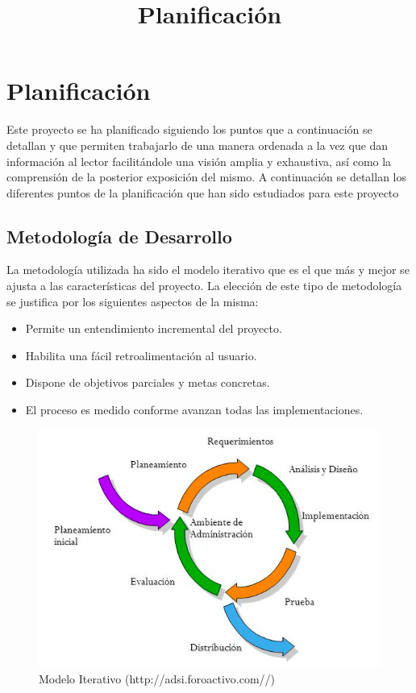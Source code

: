 \chapter{Planificación}
\title{Planificación}
\label{cap:Planificacion}

Este proyecto se ha planificado siguiendo los puntos que a continuación se detallan y que permiten trabajarlo de una manera ordenada a la vez que dan información al lector facilitándole una visión amplia y exhaustiva, así como la comprensión de la posterior exposición del mismo. A continuación se detallan los diferentes puntos de la planificación que han sido estudiados para este proyecto

\section{Metodología de Desarrollo}
La metodología utilizada ha sido el modelo iterativo que es el que más y mejor se ajusta a las características del proyecto. La elección de este tipo de metodología se justifica por los siguientes aspectos de la misma:

\begin{itemize}
  \item Permite un entendimiento incremental del proyecto.
  \item Habilita una fácil retroalimentación al usuario.
  \item Dispone de objetivos parciales y metas concretas.
  \item El proceso es medido conforme avanzan todas las implementaciones.
\end{itemize}

\begin{figure}[htb]
\centering
\includegraphics[width=1\textwidth]{./imagenes/modeloIterativo}
\caption{Modelo Iterativo (http://adsi.foroactivo.com//)} \label{fig:modeloIterativo}
\end{figure}

